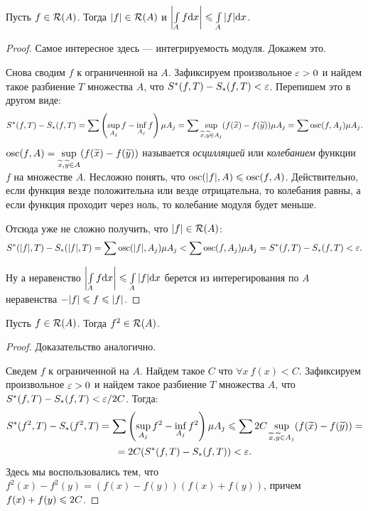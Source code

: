 \begin{Statement}
Пусть $f \in \mathcal{R}(A)$. Тогда $|f| \in \mathcal{R}(A)$ и $\left|\int\limits_A f\mathrm{d}x \right| \leqslant \int\limits_A |f|\mathrm{d}x$.
\end{Statement}
\begin{proof}
Самое интересное здесь --- интегрируемость модуля. Докажем это.

Снова сводим $f$ к ограниченной на $A$. Зафиксируем произвольное $\varepsilon > 0$ и найдем такое разбиение $T$ множества $A$, что $S^*(f, T) - S_*(f, T) < \varepsilon$. Перепишем это в другом виде:
\begin{gather*}
S^*(f, T) - S_*(f, T) =  \sum\left( \sup\limits_{A_j}f - \inf\limits_{A_j}f \right)\mu A_j = \sum\sup\limits_{\widetilde{x}, \widetilde{y} \in A_j}(f(\widetilde{x}) - f(\widetilde{y})) \mu A_j = \sum\mathrm{osc}(f, A_j)\mu A_j.
\end{gather*}
$\mathrm{osc}(f, A) = \sup\limits_{\widetilde{x}, \widetilde{y} \in A}(f(\widetilde{x}) - f(\widetilde{y}))$ называется \textit{осцилляцией} или \textit{колебанием} функции $f$ на  множестве $A$. Несложно понять, что $\mathrm{osc}(|f|, A) \leqslant \mathrm{osc}(f, A)$. Действительно, если функция везде положительна или везде отрицательна, то колебания равны, а если функция проходит через ноль, то колебание модуля будет меньше.

Отсюда уже не сложно получить, что $|f| \in \mathcal{R}(A)$:
\begin{gather*}
S^*(|f|, T) - S_*(|f|, T) =  \sum\mathrm{osc}(|f|, A_j)\mu A_j < \sum\mathrm{osc}(f, A_j)\mu A_j = S^*(f, T) - S_*(f, T) < \varepsilon.
\end{gather*}

Ну а неравенство $\left|\int\limits_A f\mathrm{d}x \right| \leqslant \int\limits_A |f|\mathrm{d}x$ берется из интерегирования по $A$ неравенства $-|f| \leq f\hm\leq|f|$.
\end{proof}

\begin{Statement}
Пусть $f \in \mathcal{R}(A)$. Тогда $f^2 \in \mathcal{R}(A)$.
\end{Statement}
\begin{proof}
Доказательство аналогично.

Сведем $f$ к ограниченной на $A$. Найдем такое $C$ что $\forall x\ f(x) < C$. Зафиксируем произвольное $\varepsilon > 0$ и найдем такое разбиение $T$ множества $A$, что $S^*(f, T) - S_*(f, T) < \varepsilon / 2C$. Тогда:
\begin{gather*}
S^*(f^2, T) - S_*(f^2, T) = \sum\left( \sup\limits_{A_j}f^2 - \inf\limits_{A_j}f^2 \right)\mu A_j \leqslant \sum 2C\sup\limits_{\widetilde{x}, \widetilde{y} \in A_j}(f(\widetilde{x}) - f(\widetilde{y})) =\\= 2C (S^*(f, T) - S_*(f, T)) < \varepsilon.
\end{gather*}
Здесь мы воспользовались тем, что $f^2(x) - f^2(y) = (f(x) - f(y))(f(x) + f(y))$, причем\\$f(x) + f(y) \hm\leq 2C$.
\end{proof}

